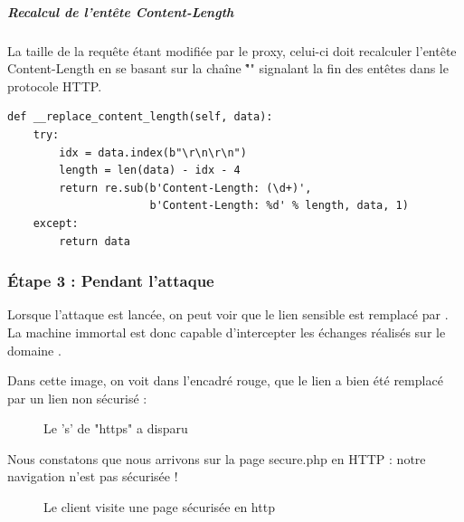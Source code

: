 \subparagraph{Recalcul de l'entête Content-Length}

La taille de la requête étant modifiée par le proxy, celui-ci doit recalculer l'entête Content-Length en se basant sur la chaîne "\r\n\r\n" signalant la fin des entêtes dans le protocole HTTP.

\begin{verbatim}
def __replace_content_length(self, data):
    try:
        idx = data.index(b"\r\n\r\n")
        length = len(data) - idx - 4
        return re.sub(b'Content-Length: (\d+)',
                      b'Content-Length: %d' % length, data, 1)
    except:
        return data
\end{verbatim}

\subsubsection{Étape 3 : Pendant l'attaque}

Lorsque l'attaque est lancée, on peut voir que le lien sensible  est remplacé par .
La machine immortal est donc capable d'intercepter les échanges réalisés sur le domaine .

Dans cette image, on voit dans l'encadré rouge, que le lien  a bien été remplacé par un lien non sécurisé  :

\begin{figure}[H]
  \caption{Le 's' de "https" a disparu}
\end{figure}

Nous constatons que nous arrivons sur la page secure.php en HTTP : notre navigation n'est pas sécurisée !

\begin{figure}[H]
  \caption{Le client visite une page sécurisée en http}
\end{figure}

